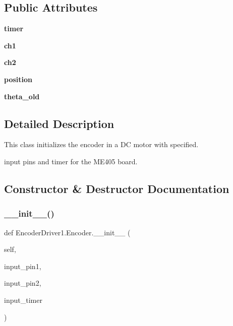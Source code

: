 \subsection*{Public Attributes}
\begin{DoxyCompactItemize}
\item 
\mbox{\label{classEncoderDriver1_1_1Encoder_ab529b3dd91016d920626d8f9966f12af}} 
{\bfseries timer}
\item 
\mbox{\label{classEncoderDriver1_1_1Encoder_a4fcd4bda5c40e8e4cba3b7ae9cf58c1c}} 
{\bfseries ch1}
\item 
\mbox{\label{classEncoderDriver1_1_1Encoder_a52d63bff85412a713fc892f1c7189d4b}} 
{\bfseries ch2}
\item 
\mbox{\label{classEncoderDriver1_1_1Encoder_ad0ea57f3b83afd3f7e3ef4f54981949e}} 
{\bfseries position}
\item 
\mbox{\label{classEncoderDriver1_1_1Encoder_ac2446b9832f6156a2c6f2179b6d77d62}} 
{\bfseries theta\+\_\+old}
\end{DoxyCompactItemize}


\subsection{Detailed Description}
This class initializes the encoder in a DC motor with specified. 

input pins and timer for the M\+E405 board. 

\subsection{Constructor \& Destructor Documentation}
\mbox{\label{classEncoderDriver1_1_1Encoder_aa7177f4e682b9507dfb0db1602137c7c}} 
\subsubsection{\texorpdfstring{\+\_\+\+\_\+init\+\_\+\+\_\+()}{\_\_init\_\_()}}
{\footnotesize\ttfamily def Encoder\+Driver1.\+Encoder.\+\_\+\+\_\+init\+\_\+\+\_\+ (\begin{DoxyParamCaption}\item[{}]{self,  }\item[{}]{input\+\_\+pin1,  }\item[{}]{input\+\_\+pin2,  }\item[{}]{input\+\_\+timer }\end{DoxyParamCaption})}




